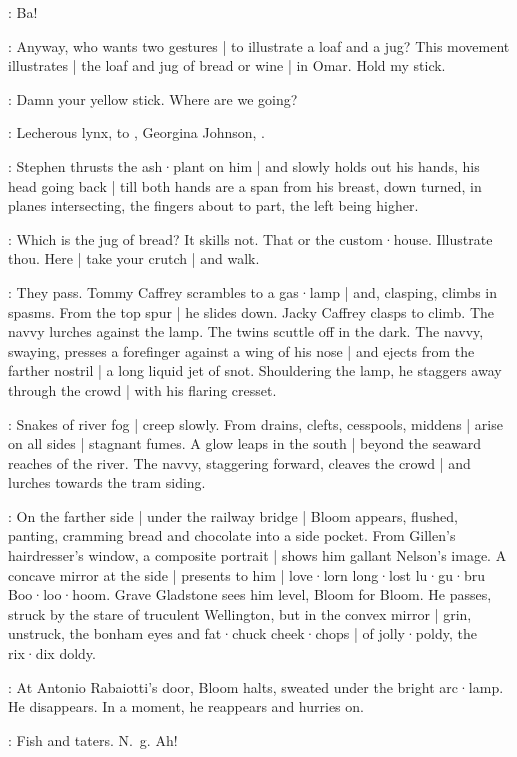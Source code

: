 \Lynch:
Ba!

\Stephen:
Anyway,
who wants two gestures |
to illustrate a loaf and a jug?
This movement illustrates |
the loaf and jug of bread or wine |
in Omar.
Hold my stick.

\Lynch:
Damn your yellow stick.
Where are we going?

\Stephen:
Lecherous lynx,
to ,
Georgina Johnson,
.

:
Stephen thrusts the ash·plant on him |
and slowly holds out his hands,
his head going back |
till both hands are a span from his breast,
down turned,
in planes intersecting,
the fingers about to part,
the left being higher.

\Lynch:
Which is the jug of bread?
It skills not.
That or the custom·house.
Illustrate thou.
Here |
take your crutch |
and walk.

:
They pass.
Tommy Caffrey scrambles to a gas·lamp |
and,
clasping,
climbs in spasms.
From the top spur |
he slides down.
Jacky Caffrey clasps to climb.
The navvy lurches against the lamp.
The twins scuttle off in the dark.
The navvy,
swaying,
presses a forefinger against a wing of his nose |
and ejects from the farther nostril |
a long liquid jet of snot.
Shouldering the lamp,
he staggers away through the crowd |
with his flaring cresset.

:
Snakes of river fog |
creep slowly.
From drains,
clefts,
cesspools,
middens |
arise on all sides |
stagnant fumes.
A glow leaps in the south |
beyond the seaward reaches of the river.
The navvy,
staggering forward,
cleaves the crowd |
and lurches towards the tram siding.

:
On the farther side |
under the railway bridge |
Bloom appears,
flushed,
panting,
cramming bread and chocolate into a side pocket.
From Gillen's hairdresser's window,
a composite portrait |
shows him gallant Nelson's image.
A concave mirror at the side |
presents to him |
love·lorn long·lost lu·gu·bru Boo·loo·hoom.
Grave Gladstone sees him level,
Bloom for Bloom.
He passes,
struck by the stare of truculent Wellington,
but in the convex mirror |
grin,
unstruck,
the bonham eyes and fat·chuck cheek·chops |
of jolly·poldy,
the rix·dix doldy.

:
At Antonio Rabaiotti's door,
Bloom halts,
sweated under the bright arc·lamp.
He disappears.
In a moment,
he reappears and hurries on.

\Bloom:
Fish and taters.
N.~g.
Ah!

